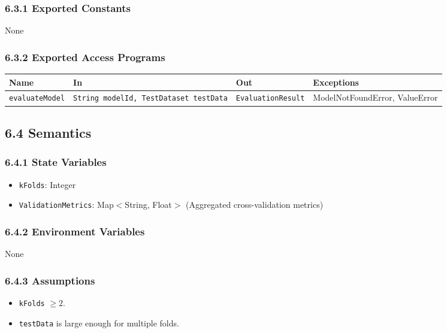 \documentclass[12pt, titlepage]{article}
\begin{document}
\subsubsection{6.3.1 Exported Constants}
None

\subsubsection{6.3.2 Exported Access Programs}
\begin{center}
\begin{tabular}{p{3.5cm} p{4.5cm} p{4cm} p{3cm}}
\hline
\textbf{Name} & \textbf{In} & \textbf{Out} & \textbf{Exceptions} \\
\hline
\texttt{evaluateModel} & \texttt{String modelId, TestDataset testData} & \texttt{EvaluationResult} & ModelNotFoundError, ValueError \\
\hline
\end{tabular}
\end{center}

\subsection{6.4 Semantics}

\subsubsection{6.4.1 State Variables}
\begin{itemize}
    \item \texttt{kFolds}: Integer
    \item \texttt{ValidationMetrics}: Map$<$String, Float$>$ (Aggregated cross-validation metrics)
\end{itemize}

\subsubsection{6.4.2 Environment Variables}
None

\subsubsection{6.4.3 Assumptions}
\begin{itemize}
    \item \texttt{kFolds} $\geq 2$.
    \item \texttt{testData} is large enough for multiple folds.
\end{itemize}
\end{document}
